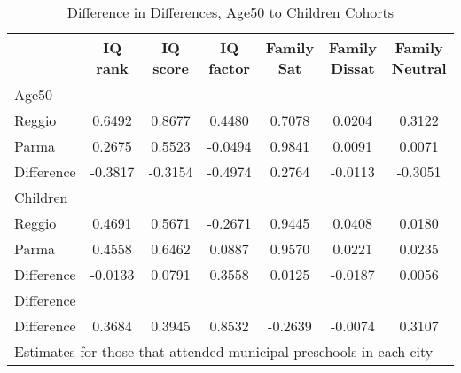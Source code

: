 \begin{table}[htbp]\centering
\caption{Difference in Differences, Age50 to Children Cohorts}
\begin{tabular}{l*{6}{c}}
\hline\hline
            &     IQ rank&    IQ score&   IQ factor&  Family Sat&Family Dissat&Family Neutral\\
\hline
Age50       &            &            &            &            &            &            \\
Reggio      &      0.6492&      0.8677&      0.4480&      0.7078&      0.0204&      0.3122\\
Parma       &      0.2675&      0.5523&     -0.0494&      0.9841&      0.0091&      0.0071\\
Difference  &     -0.3817&     -0.3154&     -0.4974&      0.2764&     -0.0113&     -0.3051\\
\hline
Children    &            &            &            &            &            &            \\
Reggio      &      0.4691&      0.5671&     -0.2671&      0.9445&      0.0408&      0.0180\\
Parma       &      0.4558&      0.6462&      0.0887&      0.9570&      0.0221&      0.0235\\
Difference  &     -0.0133&      0.0791&      0.3558&      0.0125&     -0.0187&      0.0056\\
\hline
Difference  &            &            &            &            &            &            \\
Difference  &      0.3684&      0.3945&      0.8532&     -0.2639&     -0.0074&      0.3107\\
\hline\hline
\multicolumn{7}{l}{\footnotesize Estimates for those that attended municipal preschools in each city}\\
\end{tabular}
\end{table}
